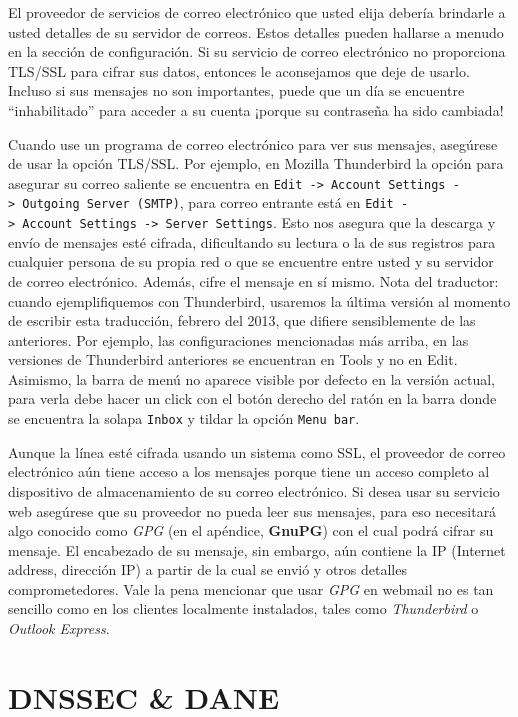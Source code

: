 \documentclass[10pt,a5paper,twoside,,]{book}
\begin{document}
El proveedor de servicios de correo electrónico que usted elija debería
brindarle a usted detalles de su servidor de correos. Estos detalles
pueden hallarse a menudo en la sección de configuración. Si su servicio
de correo electrónico no proporciona TLS/SSL para cifrar sus datos,
entonces le aconsejamos que deje de usarlo. Incluso si sus mensajes no
son importantes, puede que un día se encuentre ``inhabilitado'' para
acceder a su cuenta ¡porque su contraseña ha sido cambiada!

Cuando use un programa de correo electrónico para ver sus mensajes,
asegúrese de usar la opción TLS/SSL. Por ejemplo, en Mozilla Thunderbird
la opción para asegurar su correo saliente se encuentra en
\texttt{Edit\ -\textgreater{}\ Account\ Settings\ -\textgreater{}\ Outgoing\ Server\ (SMTP)},
para correo entrante está en
\texttt{Edit\ -\textgreater{}\ Account\ Settings\ -\textgreater{}\ Server\ Settings}.
Esto nos asegura que la descarga y envío de mensajes esté cifrada,
dificultando su lectura o la de sus registros para cualquier persona de
su propia red o que se encuentre entre usted y su servidor de correo
electrónico. Además, cifre el mensaje en sí mismo. Nota del traductor:
cuando ejemplifiquemos con Thunderbird, usaremos la última versión al
momento de escribir esta traducción, febrero del 2013, que difiere
sensiblemente de las anteriores. Por ejemplo, las configuraciones
mencionadas más arriba, en las versiones de Thunderbird anteriores se
encuentran en Tools y no en Edit. Asimismo, la barra de menú no aparece
visible por defecto en la versión actual, para verla debe hacer un click
con el botón derecho del ratón en la barra donde se encuentra la solapa
\texttt{Inbox} y tildar la opción \texttt{Menu\ bar}.

Aunque la línea esté cifrada usando un sistema como SSL, el proveedor de
correo electrónico aún tiene acceso a los mensajes porque tiene un
acceso completo al dispositivo de almacenamiento de su correo
electrónico. Si desea usar su servicio web asegúrese que su proveedor no
pueda leer sus mensajes, para eso necesitará algo conocido como
\emph{GPG} (en el apéndice, \textbf{GnuPG}) con el cual podrá cifrar su
mensaje. El encabezado de su mensaje, sin embargo, aún contiene la IP
(Internet address, dirección IP) a partir de la cual se envió y otros
detalles comprometedores. Vale la pena mencionar que usar \emph{GPG} en
webmail no es tan sencillo como en los clientes localmente instalados,
tales como \emph{Thunderbird} o \emph{Outlook Express}.

\section{DNSSEC \& DANE}\label{dnssec-dane}
\end{document}
